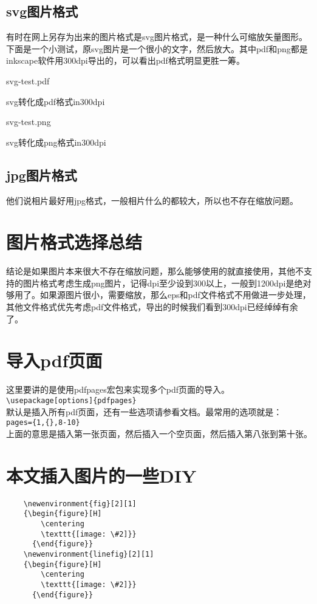 \documentclass[11pt,oneside]{book}
\begin{document}
  \subsection{svg图片格式}
  有时在网上另存为出来的图片格式是svg图片格式，是一种什么可缩放矢量图形。下面是一个小测试，原svg图片是一个很小的文字，然后放大。其中pdf和png都是inkscape软件用300dpi导出的，可以看出pdf格式明显更胜一筹。
  \begin{multicols}{2}
    \begin{linefig}{svg-test.pdf}
      \caption*{\footnotesize svg转化成pdf格式in300dpi}
    \end{linefig}
    \begin{linefig}{svg-test.png}
      \caption*{\footnotesize svg转化成png格式in300dpi}
    \end{linefig}
  \end{multicols}

  \subsection{jpg图片格式}
  他们说相片最好用jpg格式，一般相片什么的都较大，所以也不存在缩放问题。

  \section{图片格式选择总结}
  结论是如果图片本来很大不存在缩放问题，那么能够使用的就直接使用，其他不支持的图片格式考虑生成png图片，记得dpi至少设到300以上，一般到1200dpi是绝对够用了。如果源图片很小，需要缩放，那么eps和pdf文件格式不用做进一步处理，其他文件格式优先考虑pdf文件格式，导出的时候我们看到300dpi已经绰绰有余了。

  \section{导入pdf页面}
  这里要讲的是使用pdfpages宏包来实现多个pdf页面的导入。\\
  \verb+\usepackage[options]{pdfpages} +\\
  默认是插入所有pdf页面，还有一些选项请参看文档。最常用的选项就是：\\
  \verb+pages={1,{},8-10}+\\
  上面的意思是插入第一张页面，然后插入一个空页面，然后插入第八张到第十张。

  \section{本文插入图片的一些DIY}
  \begin{Verbatim}
    \newenvironment{fig}[2][1]
    {\begin{figure}[H]
        \centering
        \texttt{[image: \#2]}}
      {\end{figure}}
    \newenvironment{linefig}[2][1]
    {\begin{figure}[H]
        \centering
        \texttt{[image: \#2]}}
      {\end{figure}}
  \end{Verbatim}
\end{document}
